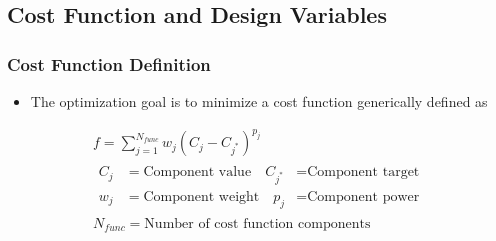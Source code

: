 \documentclass{beamer}
\begin{document}
\subsection{Cost Function and Design Variables}

\begin{frame}
  \frametitle{Cost Function Definition}
  \begin{itemize}
    \item The optimization goal is to minimize a cost function generically
      defined as
  \end{itemize}
  \vspace{-0.1cm}
\begin{gather*}
  f = \sum_{j=1}^{N_{func}}w_j\left( C_j - C_{j^*} \right)^{p_j} \\
  \begin{aligned}
    C_j &= \text{Component value} \quad C_{j^*} &= \text{Component target} \\
    w_j &= \text{Component weight} \quad p_j &= \text{Component power}
  \end{aligned} \\
  N_{func} = \text{Number of cost function components}
\end{gather*}
\end{frame}
\end{document}
